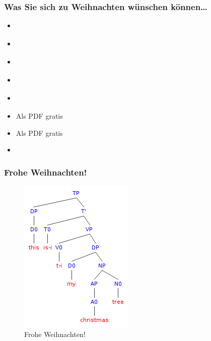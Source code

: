 \begin{frame}
\frametitle{Was Sie sich zu Weihnachten wünschen können\dots}

\begin{itemize}
	\item \citet{Glueck05a}
	\item \citet{Luedeling2009}
	\item \citet{Brandt&Co06a}
	\item \citet{Grewendorf&Co91a}
	\item \citet{Chomsky65a}
	\item \citet{MuellerS15b} \ras Als PDF gratis
	\item \citet{MuellerS13f} \ras Als PDF gratis
	\item \citet{Pinker95a}

\end{itemize}

\end{frame}


\begin{frame}
\frametitle{Frohe Weihnachten!}

\begin{figure}
\centering
	\includegraphics[scale=.57]{material/09xmastree}
	\caption{Frohe Weihnachten!}
\end{figure}

\end{frame}


